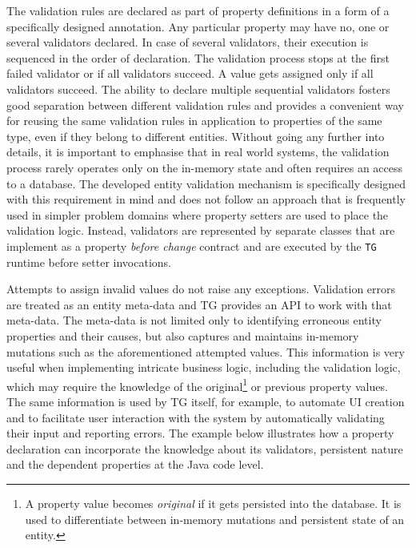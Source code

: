 \documentclass[a4paper,12pt,oneside,openright,final]{memoir} %
\begin{document}
	The validation rules are declared as part of property definitions in a form of a specifically designed annotation.
	Any particular property may have no, one or several validators declared.
	In case of several validators, their execution is sequenced in the order of declaration.
	The validation process stops at the first failed validator or if all validators succeed.
	A value gets assigned only if all validators succeed.
	The ability to declare multiple sequential validators fosters good separation between different validation rules and provides a convenient way for reusing the same validation rules in application to properties of the same type, even if they belong to different entities.
	Without going any further into details, it is important to emphasise that in real world systems, the validation process rarely operates only on the in-memory state and often requires an access to a database.
	The developed entity validation mechanism is specifically designed with this requirement in mind and does not follow an approach that is frequently used in simpler problem domains where property setters are used to place the validation logic.
	Instead, validators are represented by separate classes that are implement as a property \emph{before change} contract and are executed by the \texttt{TG} runtime before setter invocations.

	Attempts to assign invalid values do not raise any exceptions.
	Validation errors are treated as an entity meta-data and TG provides an API to work with that meta-data.
	The meta-data is not limited only to identifying erroneous entity properties and their causes, but also captures and maintains in-memory mutations such as the aforementioned attempted values.
	This information is very useful when implementing intricate business logic, including the validation logic, which may require the knowledge of the original\footnote{A property value becomes \emph{original} if it gets persisted into the database. It is used to differentiate between in-memory mutations and persistent state of an entity.} or previous property values.
	The same information is used by TG itself, for example, to automate UI creation and to facilitate user interaction with the system by automatically validating their input and reporting errors.	
	The example below illustrates how a property declaration can incorporate the knowledge about its validators, persistent nature and the dependent properties at the Java code level.
	
\end{document}
